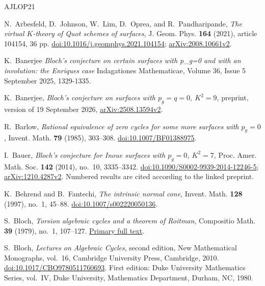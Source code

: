 \begin{thebibliography}{AJLOP21}

N.~Arbesfeld, D.~Johnson, W.~Lim, D.~Oprea, and R.~Pandharipande,
\emph{The virtual $K$-theory of Quot schemes of surfaces},
J. Geom. Phys. \textbf{164} (2021), article 104154, 36 pp.
\href{https://doi.org/10.1016/j.geomphys.2021.104154}{doi:10.1016/j.geomphys.2021.104154};
\href{https://arxiv.org/abs/2008.10661v2}{arXiv:2008.10661v2}.

K.~Banerjee
\emph{Bloch's conjecture on certain surfaces with p_g=0 and with an involution: the Enriques case}
Indagationes Mathematicae, Volume 36, Issue 5
September 2025, 1329-1335.

K.~Banerjee,
\emph{Bloch's conjecture on surfaces with $p_g=q=0,\ K^2=9$},
preprint, version of 19 September 2026,
\href{https://arxiv.org/abs/2508.13594v2}{arXiv:2508.13594v2}.

R.~Barlow,
\emph{Rational equivalence of zero cycles for some more surfaces with $p_g=0$},
Invent. Math. \textbf{79} (1985), 303--308.
\href{https://doi.org/10.1007/BF01388975}{doi:10.1007/BF01388975}.

I.~Bauer,
\emph{Bloch's conjecture for Inoue surfaces with $p_g=0$, $K^2=7$},
Proc. Amer. Math. Soc. \textbf{142} (2014), no.~10, 3335--3342.
\href{https://doi.org/10.1090/S0002-9939-2014-12246-5}{doi:10.1090/S0002-9939-2014-12246-5};
\href{https://arxiv.org/abs/1210.4287v2}{arXiv:1210.4287v2}.
Numbered results are cited according to the linked preprint.

K.~Behrend and B.~Fantechi,
\emph{The intrinsic normal cone},
Invent. Math. \textbf{128} (1997), no.~1, 45--88.
\href{https://doi.org/10.1007/s002220050136}{doi:10.1007/s002220050136}.

S.~Bloch, \emph{Torsion algebraic cycles and a theorem of Roitman},
Compositio Math. \textbf{39} (1979), no.~1, 107--127.
\href{https://www.numdam.org/item/CM_1979__39_1_107_0.pdf}{Primary full text}.

S.~Bloch, \emph{Lectures on Algebraic Cycles}, second edition,
New Mathematical Monographs, vol.~16, Cambridge University Press,
Cambridge, 2010.
\href{https://doi.org/10.1017/CBO9780511760693}{doi:10.1017/CBO9780511760693}.
First edition: Duke University Mathematics Series, vol.~IV,
Duke University, Mathematics Department, Durham, NC, 1980.


\end{thebibliography}
